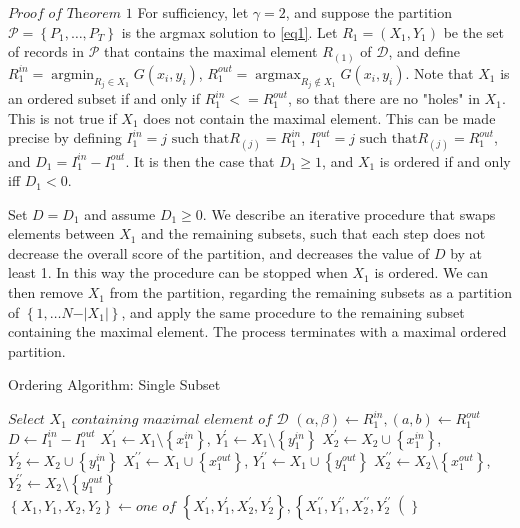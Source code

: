 \documentclass{article}
\theoremstyle{case}
\DeclareMathOperator*{\argmax}{argmax} %
\DeclareMathOperator*{\argmin}{argmin} %
\begin{document}
$\textit{Proof of Theorem 1}$
For sufficiency, let $\gamma = 2$, and suppose the partition $\mathcal{P} = \left\lbrace P_1, \dots, P_T\right\rbrace$ is the argmax solution to \ref{eq1}. Let $R_1 = (X_1, Y_1)$ be the set of records in $\mathcal{P}$ that contains the maximal element $R_{(1)}$ of $\mathcal{D}$, and define $R_1^{in} = \argmin_{R_j \in X_1} G(x_i, y_i)$, $R_1^{out} = \argmax_{R_j \not\in X_1} G(x_i, y_i)$. Note that $X_1$ is an ordered subset if and only if $R_1^{in} <= R_1^{out}$, so that there are no "holes" in $X_1$. This is not true if $X_1$ does not contain the maximal element. This can be made precise by defining $I_1^{in} = j \text{ such that} R_{(j)} = R_1^{in}$, $I_1^{out} = j \text{ such that} R_{(j)} = R_1^{out}$, and $D_1 = I_1^{in} - I_1^{out}$. It is then the case that $D_1 \geq 1$, and $X_1$ is ordered if and only iff $D_1 < 0$.

Set $D = D_1$ and assume $D_1 \geq 0$. We describe an iterative procedure that swaps elements between $X_1$ and the remaining subsets, such that each step does not decrease the overall score of the partition, and decreases the value of $D$ by at least 1. In this way the procedure can be stopped when $X_1$ is ordered. We can then remove $X_1$ from the partition, regarding the remaining subsets as a partition of $\left\lbrace 1, \dots N-\vert X_1 \vert\right\rbrace$, and apply the same procedure to the remaining subset containing the maximal element. The process terminates with a maximal ordered partition.

\begin{algorithm}
\caption{Ordering Algorithm: Single Subset}
\begin{algorithmic}[1]
\State $\textit{Select } X_1 \textit{ containing maximal element of } \mathcal{D}$
\State $\left( \alpha , \beta \right) \gets R_1^{in}, \left( a,b \right) \gets R_1^{out}$
\State $D \gets I_1^{in} - I_1^{out}$
\State $X_1^\prime \gets X_1\setminus \left\lbrace x_1^{in}\right\rbrace$, $Y_1^{\prime} \gets X_1\setminus \left\lbrace y_1^{in}\right\rbrace$
\State $X_2^{\prime} \gets X_2\cup \left\lbrace x_1^{in}\right\rbrace$, $Y_2^{\prime} \gets X_2\cup \left\lbrace y_1^{in}\right\rbrace$
\EndIf
{}
\State $X_1^{\prime\prime} \gets X_1\cup \left\lbrace x_1^{out}\right\rbrace$, $Y_1^{\prime\prime} \gets X_1\cup \left\lbrace y_1^{out}\right\rbrace$
\State $X_2^{\prime\prime} \gets X_2\setminus \left\lbrace x_1^{out}\right\rbrace$, $Y_2^{\prime\prime} \gets X_2\setminus \left\lbrace y_1^{out}\right\rbrace$
\EndIf
{}
\State $\left\lbrace X_1, Y_1, X_2, Y_2 \right\rbrace \gets \textit{one of } \left\lbrace X_1^{\prime}, Y_1^{\prime}, X_2^{\prime}, Y_2^{\prime}\right\rbrace, \left\lbrace X_1^{\prime\prime}, Y_1^{\prime\prime}, X_2^{\prime\prime}, Y_2^{\prime\prime}\right(\rbrace$
\EndIf
{}
\EndWhile
\end{algorithmic}
\end{algorithm}
\end{document}
